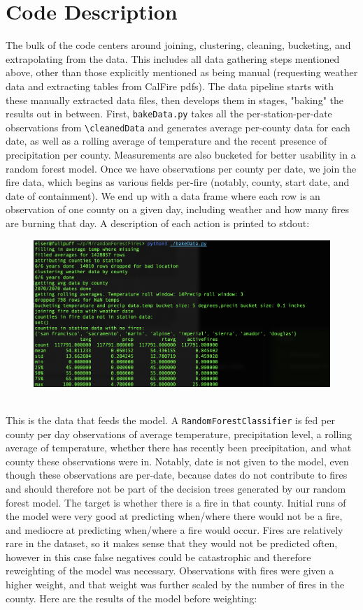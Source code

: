 \documentclass{article}
\begin{document}
\section{Code Description}
The bulk of the code centers around joining, clustering, cleaning, bucketing, and extrapolating from the data. This includes all data gathering steps mentioned above, other than those explicitly mentioned as being manual (requesting weather data and extracting tables from CalFire pdfs). The data pipeline starts with these manually extracted data files, then develops them in stages, "baking" the results out in between. First, 
\lstinline|bakeData.py| takes all the per-station-per-date observations from
\lstinline|\cleanedData| and generates average per-county data for each date, as well as a rolling average of temperature and the recent presence of precipitation per county. Measurements are also bucketed for better usability in a random forest model. Once we have observations per county per date, we join the fire data, which begins as various fields per-fire (notably, county, start date, and date of containment). We end up with a data frame where each row is an observation of one county on a given day, including weather and how many fires are burning that day. A description of each action is printed to stdout:
\begin{figure}[H]
	\includegraphics[width=\linewidth]{images/bakeDataScreenshot.png}
\end{figure}
\\
This is the data that feeds the model. A \lstinline|RandomForestClassifier| is fed per county per day observations of average temperature, precipitation level, a rolling average of temperature, whether there has recently been precipitation, and what county these observations were in. Notably, date is not given to the model, even though these observations are per-date, because dates do not contribute to fires and should therefore not be part of the decision trees generated by our random forest model. The target is whether there is a fire in that county. Initial runs of the model were very good at predicting when/where there would not be a fire, and mediocre at predicting when/where a fire would occur. Fires are relatively rare in the dataset, so it makes sense that they would not be predicted often, however in this case false negatives could be catastrophic and therefore reweighting of the model was necessary. Observations with fires were given a higher weight, and that weight was further scaled by the number of fires in the county. Here are the results of the model before weighting:
\end{document}
